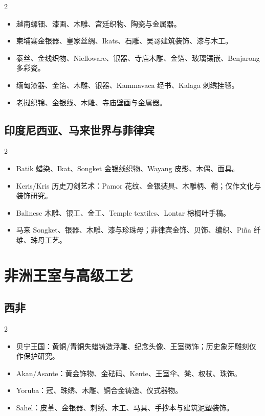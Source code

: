 \documentclass[lang=en,a4paper,11pt]{elegantpaper}
\begin{document}
\begin{multicols}{2}
\begin{itemize}
\item 越南螺钿、漆画、木雕、宫廷织物、陶瓷与金属器。
\item 柬埔寨金银器、皇家丝绸、Ikats、石雕、吴哥建筑装饰、漆与木工。
\item 泰丝、金线织物、Nielloware、银器、寺庙木雕、金箔、玻璃镶嵌、Benjarong 多彩瓷。
\item 缅甸漆器、金箔、木雕、银器、Kammavaca 经书、Kalaga 刺绣挂毯。
\item 老挝织锦、金银线、木雕、寺庙壁画与金属器。
\end{itemize}
\end{multicols}

\subsection{印度尼西亚、马来世界与菲律宾}


\begin{multicols}{2}
\begin{itemize}
\item Batik 蜡染、Ikat、Songket 金银线织物、Wayang 皮影、木偶、面具。
\item Keris/Kris 历史刀剑艺术：Pamor 花纹、金银装具、木雕柄、鞘；仅作文化与装饰研究。
\item Balinese 木雕、银工、金工、Temple textiles、Lontar 棕榈叶手稿。
\item 马来 Songket、银器、木雕、漆与珍珠母；菲律宾金饰、贝饰、编织、Piña 纤维、珠母工艺。
\end{itemize}
\end{multicols}

\section{非洲王室与高级工艺}


\subsection{西非}


\begin{multicols}{2}
\begin{itemize}
\item 贝宁王国：黄铜/青铜失蜡铸造浮雕、纪念头像、王室徽饰；历史象牙雕刻仅作保护研究。
\item Akan/Asante：黄金饰物、金砝码、Kente、王室伞、凳、权杖、珠饰。
\item Yoruba：冠、珠绣、木雕、铜合金铸造、仪式器物。
\item Sahel：皮革、金银器、刺绣、木工、马具、手抄本与建筑泥塑装饰。
\end{itemize}
\end{multicols}
\end{document}
